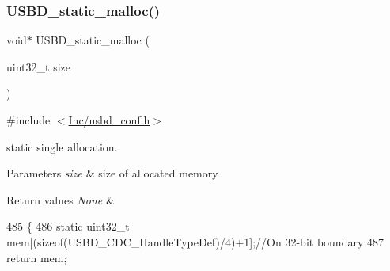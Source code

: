 \subsubsection{\texorpdfstring{U\+S\+B\+D\+\_\+static\+\_\+malloc()}{USBD\_static\_malloc()}}
{\footnotesize\ttfamily void$\ast$ U\+S\+B\+D\+\_\+static\+\_\+malloc (\begin{DoxyParamCaption}\item[{uint32\+\_\+t}]{size }\end{DoxyParamCaption})}



{\ttfamily \#include $<$\mbox{\hyperlink{usbd__conf_8h}{Inc/usbd\+\_\+conf.\+h}}$>$}



static single allocation. 


\begin{DoxyParams}{Parameters}
{\em size} & size of allocated memory \\
\hline
\end{DoxyParams}

\begin{DoxyRetVals}{Return values}
{\em None} & \\
\hline
\end{DoxyRetVals}

\begin{DoxyCode}
485 \{
486   \textcolor{keyword}{static} uint32\_t mem[(\textcolor{keyword}{sizeof}(USBD\_CDC\_HandleTypeDef)/4)+1];\textcolor{comment}{//On 32-bit boundary}
487   \textcolor{keywordflow}{return} mem;
\end{DoxyCode}
